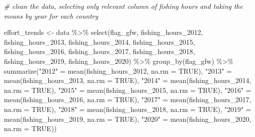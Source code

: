 \documentclass[
]{article}
\newenvironment{Shaded}{\begin{snugshade}}{\end{snugshade}}
\newcommand{\AttributeTok}[1]{\textcolor[rgb]{0.77,0.63,0.00}{#1}}
\newcommand{\CommentTok}[1]{\textcolor[rgb]{0.56,0.35,0.01}{\textit{#1}}}
\newcommand{\ConstantTok}[1]{\textcolor[rgb]{0.00,0.00,0.00}{#1}}
\newcommand{\FunctionTok}[1]{\textcolor[rgb]{0.00,0.00,0.00}{#1}}
\newcommand{\NormalTok}[1]{#1}
\newcommand{\OtherTok}[1]{\textcolor[rgb]{0.56,0.35,0.01}{#1}}
\newcommand{\SpecialCharTok}[1]{\textcolor[rgb]{0.00,0.00,0.00}{#1}}
\newcommand{\StringTok}[1]{\textcolor[rgb]{0.31,0.60,0.02}{#1}}
\begin{document}
\begin{Shaded}
\begin{Highlighting}[]
\CommentTok{\# clean the data, selecting only relevant column of fishing hours and taking the means by year for each country}

\NormalTok{effort\_trends }\OtherTok{\textless{}{-}}\NormalTok{ data }\SpecialCharTok{\%\textgreater{}\%} 
  \FunctionTok{select}\NormalTok{(flag\_gfw, }
\NormalTok{         fishing\_hours\_2012,}
\NormalTok{         fishing\_hours\_2013,}
\NormalTok{         fishing\_hours\_2014,}
\NormalTok{         fishing\_hours\_2015,}
\NormalTok{         fishing\_hours\_2016,}
\NormalTok{         fishing\_hours\_2017,}
\NormalTok{         fishing\_hours\_2018,}
\NormalTok{         fishing\_hours\_2019,}
\NormalTok{         fishing\_hours\_2020) }\SpecialCharTok{\%\textgreater{}\%} 
  \FunctionTok{group\_by}\NormalTok{(flag\_gfw) }\SpecialCharTok{\%\textgreater{}\%} 
  \FunctionTok{summarize}\NormalTok{(}\StringTok{"2012"} \OtherTok{=} \FunctionTok{mean}\NormalTok{(fishing\_hours\_2012, }\AttributeTok{na.rm =} \ConstantTok{TRUE}\NormalTok{),}
            \StringTok{"2013"} \OtherTok{=} \FunctionTok{mean}\NormalTok{(fishing\_hours\_2013, }\AttributeTok{na.rm =} \ConstantTok{TRUE}\NormalTok{),}
            \StringTok{"2014"} \OtherTok{=} \FunctionTok{mean}\NormalTok{(fishing\_hours\_2014, }\AttributeTok{na.rm =} \ConstantTok{TRUE}\NormalTok{),}
            \StringTok{"2015"} \OtherTok{=} \FunctionTok{mean}\NormalTok{(fishing\_hours\_2015, }\AttributeTok{na.rm =} \ConstantTok{TRUE}\NormalTok{),}
            \StringTok{"2016"} \OtherTok{=} \FunctionTok{mean}\NormalTok{(fishing\_hours\_2016, }\AttributeTok{na.rm =} \ConstantTok{TRUE}\NormalTok{),}
            \StringTok{"2017"} \OtherTok{=} \FunctionTok{mean}\NormalTok{(fishing\_hours\_2017, }\AttributeTok{na.rm =} \ConstantTok{TRUE}\NormalTok{),}
            \StringTok{"2018"} \OtherTok{=} \FunctionTok{mean}\NormalTok{(fishing\_hours\_2018, }\AttributeTok{na.rm =} \ConstantTok{TRUE}\NormalTok{),}
            \StringTok{"2019"} \OtherTok{=} \FunctionTok{mean}\NormalTok{(fishing\_hours\_2019, }\AttributeTok{na.rm =} \ConstantTok{TRUE}\NormalTok{),}
            \StringTok{"2020"} \OtherTok{=} \FunctionTok{mean}\NormalTok{(fishing\_hours\_2020, }\AttributeTok{na.rm =} \ConstantTok{TRUE}\NormalTok{))}
\end{Highlighting}
\end{Shaded}
\end{document}

